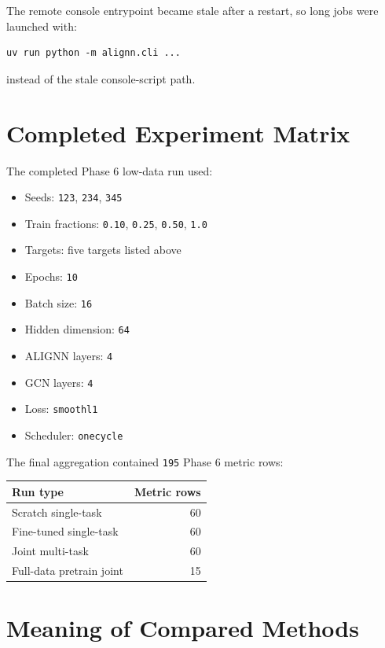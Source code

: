 \documentclass[11pt,a4paper]{article}
\begin{document}
The remote console entrypoint became stale after a restart, so long jobs were launched with:

\begin{verbatim}
uv run python -m alignn.cli ...
\end{verbatim}

instead of the stale console-script path.

\section{Completed Experiment Matrix}

The completed Phase 6 low-data run used:

\begin{itemize}
  \item Seeds: \texttt{123}, \texttt{234}, \texttt{345}
  \item Train fractions: \texttt{0.10}, \texttt{0.25}, \texttt{0.50}, \texttt{1.0}
  \item Targets: five targets listed above
  \item Epochs: \texttt{10}
  \item Batch size: \texttt{16}
  \item Hidden dimension: \texttt{64}
  \item ALIGNN layers: \texttt{4}
  \item GCN layers: \texttt{4}
  \item Loss: \texttt{smoothl1}
  \item Scheduler: \texttt{onecycle}
\end{itemize}

The final aggregation contained \texttt{195} Phase 6 metric rows:

\begin{center}
\begin{tabular}{lr}
\toprule
Run type & Metric rows \\
\midrule
Scratch single-task & 60 \\
Fine-tuned single-task & 60 \\
Joint multi-task & 60 \\
Full-data pretrain joint & 15 \\
\bottomrule
\end{tabular}
\end{center}

\section{Meaning of Compared Methods}
\end{document}
